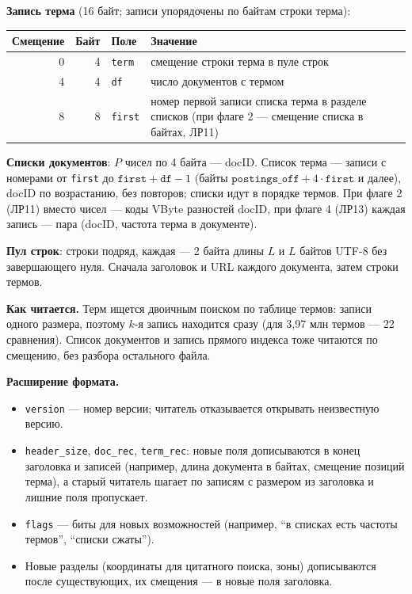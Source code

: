 \textbf{Запись терма} (16 байт; записи упорядочены по байтам строки терма):
\begin{center}
\small
\begin{tabular}{|r|r|l|p{}|}
\hline
Смещение & Байт & Поле & Значение \\
\hline
0 & 4 & \texttt{term} & смещение строки терма в пуле строк \\
4 & 4 & \texttt{df} & число документов с термом \\
8 & 8 & \texttt{first} & номер первой записи списка терма в разделе списков (при флаге 2 --- смещение списка в байтах, ЛР11) \\
\hline
\end{tabular}
\end{center}

\textbf{Списки документов}: $P$ чисел по 4 байта --- docID. Список терма --- записи с номерами от \texttt{first} до $\texttt{first} + \texttt{df} - 1$ (байты $\texttt{postings\_off} + 4 \cdot \texttt{first}$ и далее), docID по возрастанию, без повторов; списки идут в порядке термов. При флаге 2 (ЛР11) вместо чисел --- коды VByte разностей docID, при флаге 4 (ЛР13) каждая запись --- пара (docID, частота терма в документе).

\textbf{Пул строк}: строки подряд, каждая --- 2 байта длины $L$ и $L$ байтов UTF-8 без завершающего нуля. Сначала заголовок и URL каждого документа, затем строки термов.

\textbf{Как читается.} Терм ищется двоичным поиском по таблице термов: записи одного размера, поэтому $k$-я запись находится сразу (для 3,97 млн термов --- 22 сравнения). Список документов и запись прямого индекса тоже читаются по смещению, без разбора остального файла.

\textbf{Расширение формата.}
\begin{itemize}
    \item \texttt{version} --- номер версии; читатель отказывается открывать неизвестную версию.
    \item \texttt{header\_size}, \texttt{doc\_rec}, \texttt{term\_rec}: новые поля дописываются в конец заголовка и записей (например, длина документа в байтах, смещение позиций терма), а старый читатель шагает по записям с размером из заголовка и лишние поля пропускает.
    \item \texttt{flags} --- биты для новых возможностей (например, \enquote{в списках есть частоты термов}, \enquote{списки сжаты}).
    \item Новые разделы (координаты для цитатного поиска, зоны) дописываются после существующих, их смещения --- в новые поля заголовка.
\end{itemize}
